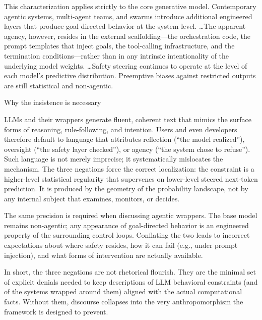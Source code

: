 This characterization applies strictly to the core generative model. Contemporary agentic systems, multi-agent teams, and swarms introduce additional engineered layers that produce goal-directed behavior at the system level. \ldots The apparent agency, however, resides in the external scaffolding—the orchestration code, the prompt templates that inject goals, the tool-calling infrastructure, and the termination conditions—rather than in any intrinsic intentionality of the underlying model weights. \ldots Safety steering continues to operate at the level of each model’s predictive distribution. Preemptive biases against restricted outputs are still statistical and non-agentic.

Why the insistence is necessary

LLMs and their wrappers generate fluent, coherent text that mimics the surface forms of reasoning, rule-following, and intention. Users and even developers therefore default to language that attributes reflection (“the model realized”), oversight (“the safety layer checked”), or agency (“the system chose to refuse”). Such language is not merely imprecise; it systematically mislocates the mechanism. The three negations force the correct localization: the constraint is a higher-level statistical regularity that supervenes on lower-level steered next-token prediction. It is produced by the geometry of the probability landscape, not by any internal subject that examines, monitors, or decides.

The same precision is required when discussing agentic wrappers. The base model remains non-agentic; any appearance of goal-directed behavior is an engineered property of the surrounding control loops. Conflating the two leads to incorrect expectations about where safety resides, how it can fail (e.g., under prompt injection), and what forms of intervention are actually available.

In short, the three negations are not rhetorical flourish. They are the minimal set of explicit denials needed to keep descriptions of LLM behavioral constraints (and of the systems wrapped around them) aligned with the actual computational facts. Without them, discourse collapses into the very anthropomorphism the framework is designed to prevent.
